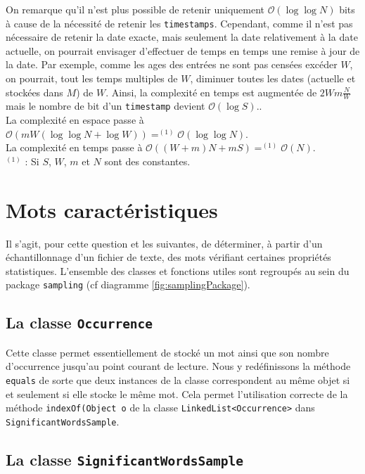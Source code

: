 \documentclass[12pt,a4paper,titlepage]{article}
\newcommand{\class}[1]{\texttt{#1}}
\begin{document}
On remarque qu'il n'est plus possible de retenir uniquement $\mathcal{O}(\log \log N)$ bits à cause de la nécessité de retenir les \class{timestamps}.
Cependant, comme il n'est pas nécessaire de retenir la date exacte, mais seulement la date relativement à la  date actuelle, on pourrait envisager d'effectuer de temps en temps une remise à jour de la date. Par exemple, comme les ages des entrées ne sont pas censées excéder $W$, on pourrait, tout les temps multiples de $W$, diminuer toutes les dates (actuelle et stockées dans $M$) de $W$. Ainsi, la complexité en temps est augmentée de $2Wm\frac{N}{W}$ mais le nombre de bit d'un \class{timestamp} devient $\mathcal{O}(\log S)$..\\
La complexité en espace passe à $\mathcal{O}(mW (\log \log N + \log W)) =^{(1)} \mathcal{O}(\log \log N)$.\\
La complexité en temps passe à $\mathcal{O}((W+m)N + mS) =^{(1)} \mathcal{O}(N)$.\\
$^{(1)}$ : Si $S$, $W$, $m$ et $N$ sont des constantes.

\newpage
\section{Mots caractéristiques}

Il s'agit, pour cette question et les suivantes, de déterminer, à partir d'un échantillonnage d'un fichier de texte, des mots vérifiant certaines propriétés statistiques. L'ensemble des classes et fonctions utiles sont regroupés au sein du package \class{sampling} (cf diagramme \ref{fig:samplingPackage}).\\

\subsection{La classe \class{Occurrence}}

Cette classe permet essentiellement de stocké un mot ainsi que son nombre d'occurrence jusqu'au point courant de lecture. Nous y redéfinissons la méthode \class{equals} de sorte que deux instances de la classe correspondent au même objet si et seulement si elle stocke le même mot. Cela permet l'utilisation correcte de la méthode \class{indexOf(Object o} de la classe \class{LinkedList<Occurrence>} dans \class{SignificantWordsSample}.


\subsection{La classe \class{SignificantWordsSample}}
\end{document}

